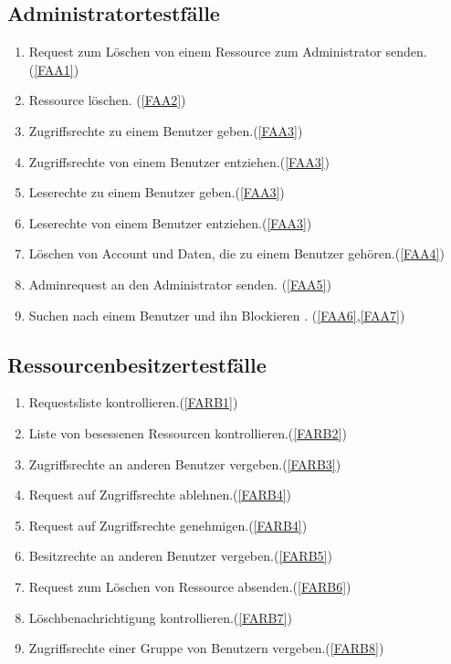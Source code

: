 \documentclass[parskip=full,11pt]{scrartcl}
\def\threedigits#1{%
  \ifnum#1<10 0\fi
  \ifnum#1<1 0\fi
  \number#1}
\begin{document}
\subsection{Administratortestfälle}
\begin{enumerate}[label={\textbf{/T\protect\threedigits{\theenumi}0/}}, leftmargin=*, resume]
\item Request zum Löschen von einem Ressource zum Administrator senden. (\ref{FAA1})
\item Ressource löschen. (\ref{FAA2})
\item Zugriffsrechte zu einem Benutzer geben.(\ref{FAA3})
\item Zugriffsrechte von einem Benutzer entziehen.(\ref{FAA3})
\item Leserechte zu einem Benutzer geben.(\ref{FAA3})
\item Leserechte von einem Benutzer entziehen.(\ref{FAA3})
\item Löschen von Account und Daten, die zu einem Benutzer gehören.(\ref{FAA4})
\item Adminrequest an den Administrator senden. (\ref{FAA5})
\item Suchen nach einem Benutzer und ihn Blockieren . (\ref{FAA6},\ref{FAA7})


\end{enumerate}

\subsection{Ressourcenbesitzertestfälle}
\begin{enumerate}[label={\textbf{/T\protect\threedigits{\theenumi}0/}}, leftmargin=*, resume]
\item Requestsliste kontrollieren.(\ref{FARB1})
\item Liste von besessenen Ressourcen kontrollieren.(\ref{FARB2})  %
\item Zugriffsrechte an anderen Benutzer vergeben.(\ref{FARB3})
\item Request auf Zugriffsrechte ablehnen.(\ref{FARB4})
\item Request auf Zugriffsrechte genehmigen.(\ref{FARB4})
\item Besitzrechte an anderen Benutzer vergeben.(\ref{FARB5})
\item Request zum Löschen von Ressource absenden.(\ref{FARB6})
\item Löschbenachrichtigung kontrollieren.(\ref{FARB7})
\item Zugriffsrechte einer Gruppe von Benutzern vergeben.(\ref{FARB8}) 
\end{enumerate}
\newpage
\printglossary	
\glsaddall
\end{document}
